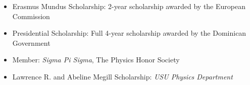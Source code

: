 \documentclass[letterpaper,10pt]{article}
\begin{document}
\begin{itemize}[label=$\blacktriangleright$]

  \item Erasmus Mundus Scholarship: 2-year scholarship awarded by the European Commission %
\item Presidential Scholarship: Full 4-year scholarship awarded by the Dominican Government %


\item  Member: \emph{Sigma Pi Sigma}, The Physics Honor Society %


\item Lawrence  R. and Abeline Megill Scholarship: \emph{USU Physics Department}   %
  \end{itemize}
\end{document}
